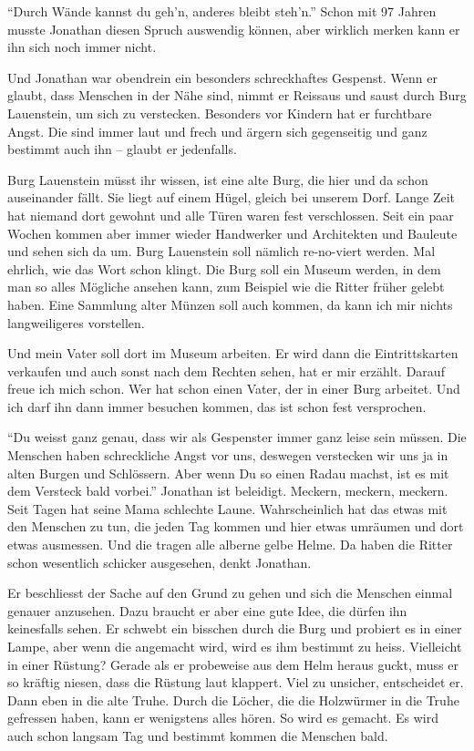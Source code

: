 \enquote{Durch Wände kannst du geh'n, anderes bleibt steh'n.} Schon mit 97 Jahren musste Jonathan diesen Spruch auswendig können, aber wirklich merken kann er ihn sich noch immer nicht. 

Und Jonathan war obendrein ein besonders schreckhaftes Gespenst. Wenn er glaubt, dass Menschen in der Nähe sind, nimmt er Reissaus und saust durch Burg Lauenstein, um sich zu verstecken. Besonders vor Kindern hat er furchtbare Angst. Die sind immer laut und frech und ärgern sich gegenseitig und ganz bestimmt auch ihn -- glaubt er jedenfalls. 

\begin{mdframed}[style=mystyle]
Burg Lauenstein müsst ihr wissen, ist eine alte Burg, die hier und da schon auseinander fällt. Sie liegt auf einem Hügel, gleich bei unserem Dorf. Lange Zeit hat niemand dort gewohnt und alle Türen waren fest verschlossen. Seit ein paar Wochen kommen aber immer wieder Handwerker und Architekten und Bauleute und sehen sich da um. Burg Lauenstein soll nämlich re-no-viert werden. Mal ehrlich, wie das Wort schon klingt. Die Burg soll ein Museum werden, in dem man so alles Mögliche ansehen kann, zum Beispiel wie die Ritter früher gelebt haben. Eine Sammlung alter Münzen soll auch kommen, da kann ich mir nichts langweiligeres vorstellen. 

Und mein Vater soll dort im Museum arbeiten. Er wird dann die Eintrittskarten verkaufen und auch sonst nach dem Rechten sehen, hat er mir erzählt. Darauf freue ich mich schon. Wer hat schon einen Vater, der in einer Burg arbeitet. Und ich darf ihn dann immer besuchen kommen, das ist schon fest versprochen.
\end{mdframed}

\enquote{Du weisst ganz genau, dass wir als Gespenster immer ganz leise sein müssen. Die Menschen haben schreckliche Angst vor uns, deswegen verstecken wir uns ja in alten Burgen und Schlössern. Aber wenn Du so einen Radau machst, ist es mit dem Versteck bald vorbei.} Jonathan ist beleidigt. Meckern, meckern, meckern. Seit Tagen hat seine Mama schlechte Laune. Wahrscheinlich hat das etwas mit den Menschen zu tun, die jeden Tag kommen und hier etwas umräumen und dort etwas ausmessen. Und die tragen alle alberne gelbe Helme. Da haben die Ritter schon wesentlich schicker ausgesehen, denkt Jonathan. 

Er beschliesst der Sache auf den Grund zu gehen und sich die Menschen einmal genauer anzusehen. Dazu braucht er aber eine gute Idee, die dürfen ihn keinesfalls sehen. Er schwebt ein bisschen durch die Burg und probiert es in einer Lampe, aber wenn die angemacht wird, wird es ihm bestimmt zu heiss. Vielleicht in einer Rüstung? Gerade als er probeweise aus dem Helm heraus guckt, muss er so kräftig niesen, dass die Rüstung laut klappert. Viel zu unsicher, entscheidet er. Dann eben in die alte Truhe. Durch die Löcher, die die Holzwürmer in die Truhe gefressen haben, kann er wenigstens alles hören. So wird es gemacht. Es wird auch schon langsam Tag und bestimmt kommen die Menschen bald. 

